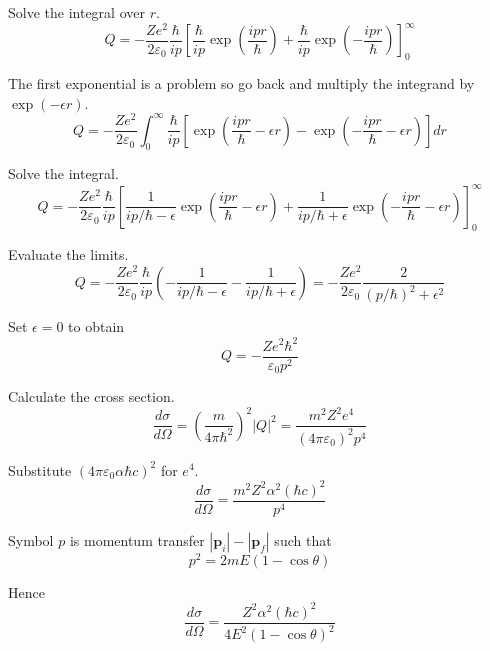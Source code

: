 Solve the integral over $r$.
\begin{equation*}
Q=-\frac{Ze^2}{2\varepsilon_0}\frac{\hbar}{ip}
\left[
\frac{\hbar}{ip}
\exp\left(\frac{ipr}{\hbar}\right)
+\frac{\hbar}{ip}
\exp\left(-\frac{ipr}{\hbar}\right)
\right]_0^\infty
\end{equation*}

The first exponential is a problem
so go back and multiply the integrand by $\exp(-\epsilon r)$.
\begin{equation*}
Q=-\frac{Ze^2}{2\varepsilon_0}
\int_0^\infty
\frac{\hbar}{ip}
\left[\exp\left(\frac{ipr}{\hbar}-\epsilon r\right)
-\exp\left(-\frac{ipr}{\hbar}-\epsilon r\right)\right]
dr
\end{equation*}

Solve the integral.
\begin{equation*}
Q=-\frac{Ze^2}{2\varepsilon_0}
\frac{\hbar}{ip}
\left[
\frac{1}{ip/\hbar-\epsilon}\exp\left(\frac{ipr}{\hbar}-\epsilon r\right)
+\frac{1}{ip/\hbar+\epsilon}\exp\left(-\frac{ipr}{\hbar}-\epsilon r\right)
\right]_0^\infty
\end{equation*}

Evaluate the limits.
\begin{equation*}
Q=-\frac{Ze^2}{2\varepsilon_0}
\frac{\hbar}{ip}
\left(-\frac{1}{ip/\hbar-\epsilon}-\frac{1}{ip/\hbar+\epsilon}\right)
=-\frac{Ze^2}{2\varepsilon_0}\frac{2}{(p/\hbar)^2+\epsilon^2}
\tag{1}
\end{equation*}

Set $\epsilon=0$ to obtain
\begin{equation*}
Q=-\frac{Ze^2\hbar^2}{\varepsilon_0p^2}
\end{equation*}

Calculate the cross section.
\begin{equation*}
\frac{d\sigma}{d\Omega}=\left(\frac{m}{4\pi\hbar^2}\right)^2|Q|^2
=\frac{m^2Z^2e^4}{(4\pi\varepsilon_0)^2p^4}
\tag{2}
\end{equation*}

Substitute $(4\pi\varepsilon_0\alpha\hbar c)^2$ for $e^4$.
\begin{equation*}
\frac{d\sigma}{d\Omega}=\frac{m^2Z^2\alpha^2(\hbar c)^2}{p^4}
\end{equation*}

Symbol $p$ is momentum transfer $|\mathbf p_i|-|\mathbf p_f|$ such that
\begin{equation*}
p^2=2mE(1-\cos\theta)
\end{equation*}

Hence
\begin{equation*}
\frac{d\sigma}{d\Omega}=\frac{Z^2\alpha^2(\hbar c)^2}{4E^2(1-\cos\theta)^2}
\tag{3}
\end{equation*}

